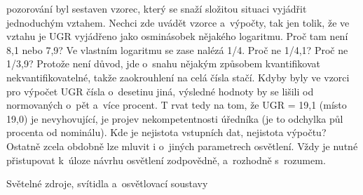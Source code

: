 pozorování byl sestaven vzorec, který se snaží složitou situaci vyjádřit jednoduchým vztahem.
Nechci zde uvádět vzorce a~výpočty, tak jen tolik, že ve vztahu je UGR vyjádřeno jako osminásobek
nějakého logaritmu. Proč tam není 8,1 nebo 7,9? Ve vlastním logaritmu se zase nalézá 1/4.
Proč ne 1/4,1? Proč ne 1/3,9? Protože není důvod, jde o~snahu nějakým způsobem kvantifikovat
nekvantifikovatelné, takže zaokrouhlení na celá čísla stačí. Kdyby byly ve vzorci pro výpočet
UGR čísla o~desetinu jiná, výsledné hodnoty by se lišili od normovaných o~pět a~více procent. T
rvat tedy na tom, že UGR = 19,1 (místo 19,0) je nevyhovující, je projev nekompetentnosti úředníka
(je to odchylka půl procenta od nominálu). Kde je nejistota vstupních dat, nejistota výpočtu?
Ostatně zcela obdobně lze mluvit i o~jiných parametrech osvětlení. Vždy je nutné přistupovat
k~úloze návrhu osvětlení zodpovědně, a~rozhodně s~rozumem.

\sec Světelné zdroje, svítidla a~osvětlovací soustavy

